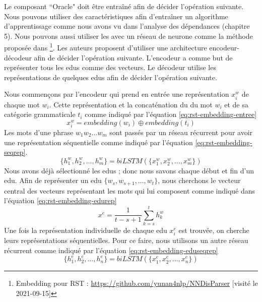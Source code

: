 \documentclass{KodeBook}
\begin{document}
Le composant ``Oracle" doit être entraîné afin de décider l'opération suivante. 
Nous pouvons utiliser des caractéristiques afin d'entraîner un algorithme d'apprentissage comme nous avons vu dans l'analyse des dépendances (chapitre 5). 
Nous pouvons aussi utiliser les  avec un réseau de neurone comme la méthode proposée dans \cite{2018-yu-al}\footnote{Embedding pour RST : \url{https://github.com/yunan4nlp/NNDisParser} [visité le 2021-09-15]}. 
Les auteurs proposent d'utiliser une architecture encodeur-décodeur afin de décider l'opération suivante. 
L'encodeur a comme but de représenter tous les \acp{edu} comme des vecteurs.
Le décodeur utilise les représentations de quelques \acp{edu} afin de décider l'opération suivante. 

Nous commençons par l'encodeur qui prend en entrée une représentation $x_i^w$ de chaque mot $w_i$. 
Cette représentation et la concaténation du  du mot $w_i$ et de sa catégorie grammaticale $t_i$ comme indiqué par l'équation \ref{eq:rst-embedding-entree}
\begin{equation}\label{eq:rst-embedding-entree}
x_i^w = embedding(w_i) \oplus embedding(t_i)
\end{equation}
Les mots d'une phrase $w_1 w_2 \ldots w_m$ sont passés par un réseau récurrent  pour avoir une représentation séquentielle comme indiqué par l'équation \ref{eq:rst-embedding-seqrep}.
\begin{equation}\label{eq:rst-embedding-seqrep}
\{h_1^w, h_2^w, \ldots, h_m^w \} = biLSTM(\{x_1^w, x_2^w, \ldots, x_m^w \})
\end{equation}
Nous avons déjà sélectionné les \ac{edu}s ; donc nous savons chaque début et fin d'un \ac{edu}. 
Afin de représenter un \ac{edu} $\{w_s, w_{s+1}, \ldots, w_t \}$, nous cherchons le vecteur central des vecteurs représentant les mots qui lui composent comme indiqué dans l'équation \ref{eq:rst-embedding-edurep}
\begin{equation}\label{eq:rst-embedding-edurep}
x^e = \frac{1}{t-s+1} \sum_{k=s}^{t} h_k^w
\end{equation}
Une fois la représentation individuelle de chaque \ac{edu} $x_i^e$ est trouvée, on cherche leurs représentations séquentielles. 
Pour ce faire, nous utilisons un autre réseau récurrent  comme indiqué par l'équation \ref{eq:rst-embedding-eduseqrep}
\begin{equation}\label{eq:rst-embedding-eduseqrep}
\{h_1^e, h_2^e, \ldots, h_n^e \} = biLSTM(\{x_1^e, x_2^e, \ldots, x_n^e \})
\end{equation}
\end{document}
